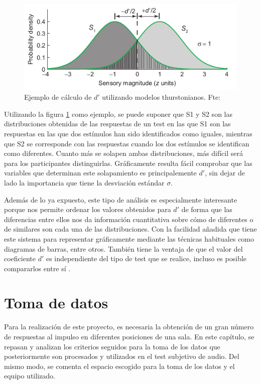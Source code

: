 \documentclass[11pt,a4paper]{book}
\begin{document}
            \begin{figure}[H]
                \includegraphics[scale=0.7]{../imagenes/modelosthurst.png}
			    \centering
			    \caption{Ejemplo de cálculo de $d'$ utilizando modelos thurstonianos. Fte: \cite{PsychophysicsB} }
			    \label{fig:modelost}
            \end{figure}
            
            Utilizando la figura \ref{fig:modelost} como ejemplo, se puede suponer que S1 y S2 son las distribuciones obtenidas de las respuestas de un test en las que S1 son las respuestas en las que dos estímulos han sido identificados como iguales, mientras que S2 se corresponde con las respuestas cuando los dos estímulos se identifican como diferentes. Cuanto más se solapen ambas distribuciones, más difícil será para los participantes distinguirlas. Gráficamente resulta fácil comprobar que las variables que determinan este solapamiento es principalemente $d'$, sin dejar de lado la importancia que tiene la desviación estándar $\sigma$.
            
            Además de lo ya expuesto, este tipo de análisis es especialmente interesante porque nos permite ordenar los valores obtenidos para $d'$ de forma que las diferencias entre ellos nos da información cuantitativa sobre cómo de diferentes o de similares son cada una de las distribuciones. Con la facilidad añadida que tiene este sistema para representar gráficamente mediante las técnicas habituales como diagramas de barras, entre otros. También tiene la ventaja de que el valor del coeficiente $d'$ es independiente del tipo de test que se realice, incluso es posible compararlos entre sí \cite{delaPrida2021}.
            

\chapter{Toma de datos}
	Para la realización de este proyecto, es necesaria la obtención de un gran número de respuestas al impulso en diferentes posiciones de una sala. En este capítulo, se repasan y analizan los criterios seguidos para la toma de los datos que posteriormente son procesados y utilizados en el test subjetivo de audio. Del mismo modo, se comenta el espacio escogido para la toma de los datos y el equipo utilizado.
\end{document}
